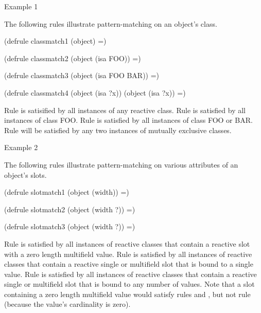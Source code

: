 \documentclass[letterpaper,10pt,english]{sphinxmanual}
\begin{document}
Example 1

The following rules illustrate pattern-matching on an object’s class.

\begin{sphinxVerbatim}[commandchars=\\\{\}]
(defrule class\PYGZhy{}match\PYGZhy{}1
  (object)
  =\PYGZgt{})

(defrule class\PYGZhy{}match\PYGZhy{}2
  (object (is\PYGZhy{}a FOO))
  =\PYGZgt{})

(defrule class\PYGZhy{}match\PYGZhy{}3
  (object (is\PYGZhy{}a FOO \textbar{} BAR))
  =\PYGZgt{})

(defrule class\PYGZhy{}match\PYGZhy{}4
  (object (is\PYGZhy{}a ?x))
  (object (is\PYGZhy{}a \PYGZti{}?x))
  =\PYGZgt{})
\end{sphinxVerbatim}

Rule  is satisified by all instances of any reactive
class. Rule  is satisfied by all instances of class FOO.
Rule  is satisfied by all instances of class FOO or BAR.
Rule  will be satisfied by any two instances of mutually
exclusive classes.

Example 2

The following rules illustrate pattern-matching on various attributes of
an object’s slots.

\begin{sphinxVerbatim}[commandchars=\\\{\}]
(defrule slot\PYGZhy{}match\PYGZhy{}1
  (object (width))
  =\PYGZgt{})

(defrule slot\PYGZhy{}match\PYGZhy{}2
  (object (width ?))
  =\PYGZgt{})

(defrule slot\PYGZhy{}match\PYGZhy{}3
  (object (width \PYGZdl{}?))
  =\PYGZgt{})
\end{sphinxVerbatim}

Rule  is satisfied by all instances of reactive classes
that contain a reactive  slot with a zero length multifield
value. Rule  is satisfied by all instances of reactive
classes that contain a reactive single or multifield  slot that
is bound to a single value. Rule  is satisfied by all
instances of reactive classes that contain a reactive single or
multifield  slot that is bound to any number of values. Note that
a slot containing a zero length multifield value would satisfy rules
 and , but not rule  (because
the value’s cardinality is zero).
\end{document}
